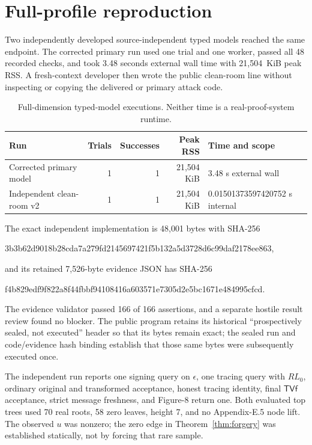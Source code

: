 \documentclass[10pt,a4paper]{article}
\newcommand{\TVf}{\mathsf{TVf}}
\begin{document}
\section{Full-profile reproduction}

Two independently developed source-independent typed models reached the same
endpoint. The corrected primary run used one trial and one worker, passed all
48 recorded checks, and took 3.48 seconds external wall time with 21,504~KiB
peak RSS. A fresh-context developer then wrote the public clean-room line
without inspecting or copying the delivered or primary attack code.

\begin{table}[h]
\centering
\small
\begin{tabular}{@{}lrrrl@{}}
\toprule
Run & Trials & Successes & Peak RSS & Time and scope \\
\midrule
Corrected primary model & 1 & 1 & 21,504 KiB & 3.48 s external wall \\
Independent clean-room v2 & 1 & 1 & 21,504 KiB & 0.01501373597420752 s internal \\
\bottomrule
\end{tabular}
\caption{Full-dimension typed-model executions. Neither time is a real-proof-system runtime.}
\label{tab:runs}
\end{table}

The exact independent implementation is 48,001 bytes with SHA-256
\begin{center}
\small\ttfamily
3b3b62d9018b28cda7a279fd2145697421f5b132a5d3728d6c99daf2178ee863,
\end{center}
and its retained 7,526-byte evidence JSON has SHA-256
\begin{center}
\small\ttfamily
f4b829edf9f822a8f44fbbf94108416a603571e7305d2e5bc1671e484995cfcd.
\end{center}
The evidence validator passed 166 of 166 assertions, and a separate hostile
result review found no blocker. The public program retains its historical
``prospectively sealed, not executed'' header so that its bytes remain exact;
the sealed run and code/evidence hash binding establish that those same bytes
were subsequently executed once.

The independent run reports one signing query on $\epsilon$, one tracing
query with $RL_0$, ordinary original and transformed acceptance, honest
tracing identity, final $\TVf$ acceptance, strict message freshness, and
Figure-8 return one. Both evaluated top trees used 70 real roots, 58 zero
leaves, height 7, and no Appendix-E.5 node lift. The observed $u$ was nonzero;
the zero edge in Theorem~\ref{thm:forgery} was established statically, not by
forcing that rare sample.
\end{document}
